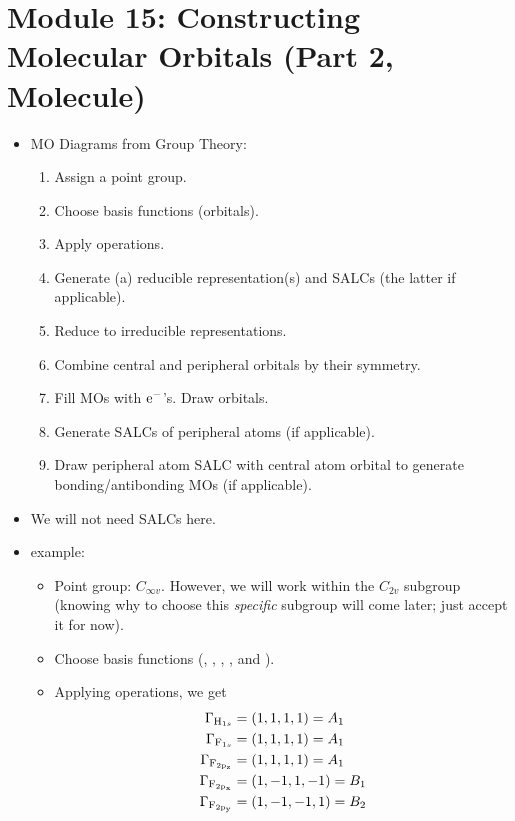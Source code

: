 \documentclass[../notes.tex]{subfiles}
\begin{document}
\section{Module 15: Constructing Molecular Orbitals (Part 2,  Molecule)}
\begin{itemize}
    \item {}MO Diagrams from Group Theory:
    \begin{enumerate}
        \item Assign a point group.
        \item Choose basis functions (orbitals).
        \item Apply operations.
        \item Generate (a) reducible representation(s) and SALCs (the latter if applicable).
        \item Reduce to irreducible representations.
        \item Combine central and peripheral orbitals by their symmetry.
        \item Fill MOs with $\e[-]$'s. Draw orbitals.
        \item Generate SALCs of peripheral atoms (if applicable).
        \item Draw peripheral atom SALC with central atom orbital to generate bonding/antibonding MOs (if applicable).
    \end{enumerate}
    \item We will not need SALCs here.
    \item {} example:
    \begin{itemize}
        \item Point group: $C_{\infty v}$. However, we will work within the $C_{2v}$ subgroup (knowing why to choose this \emph{specific} subgroup will come later; just accept it for now).
        \item Choose basis functions (, , , , and ).
        \item Applying operations, we get
        \begin{align*}
            \Gamma_{\ce{H_{1s}}} &= (1,1,1,1) = A_1\\
            \Gamma_{\ce{F_{1s}}} &= (1,1,1,1) = A_1\\
            \Gamma_{\ce{F_{2p_z}}} &= (1,1,1,1) = A_1\\
            \Gamma_{\ce{F_{2p_x}}} &= (1,-1,1,-1) = B_1\\
            \Gamma_{\ce{F_{2p_y}}} &= (1,-1,-1,1) = B_2

\end{align*}
\end{itemize}
\end{itemize}
\end{document}
